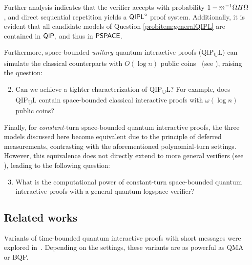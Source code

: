 \documentclass[11pt, a4paper]{article}
\numberwithin{equation}{section}
\numberwithin{figure}{section}
\newcommand{\BQP}{\textnormal{\textsf{BQP}}\xspace}
\newcommand{\QMA}{\textnormal{\textsf{QMA}}\xspace}
\newcommand{\QIP}{\textnormal{\textsf{QIP}}\xspace}
\newcommand{\QIPL}{\textnormal{\textsf{QIPL}}\xspace}
\newcommand{\QIPUL}{\texorpdfstring{\textnormal{\textsf{QIP}\textsubscript{\textnormal{U}}\textsf{L}}}\xspace}
\newcommand{\PSPACE}{\textnormal{\textsf{PSPACE}}\xspace}
\let\ket\relax\DeclarePairedDelimiter\ket{\lvert}{\rangle}
\let\bra\relax\DeclarePairedDelimiter\bra{\langle}{\rvert}
\begin{document}
Further analysis indicates that the verifier accepts with probability $1-m^{-1} \bra{\Omega} H \ket{\Omega}$, and direct sequential repetition yields a $\QIPL^{\diamond}$ proof system. 
Additionally, it is evident that all candidate models of Question \ref{probitem:generalQIPL} are contained in $\QIP$, and thus in $\PSPACE$.

\vspace{0.5em}
Furthermore, space-bounded \textit{unitary} quantum interactive proofs (\QIPUL{}) can simulate the classical counterparts with $O(\log{n})$ public coins~\cite{Fortnow89} (see ), raising the question: 
\begin{enumerate}[label={\upshape(\alph*)},itemsep=0.3em,topsep=0.3em,parsep=0.3em]
    \setcounter{enumi}{1}
    \item Can we achieve a tighter characterization of \QIPUL{}? For example, does \QIPUL{} contain space-bounded classical interactive proofs with $\omega(\log{n})$ public coins? \label{probitem:QIPUL}
\end{enumerate}

\vspace{0.5em}
Finally, for \textit{constant}-turn space-bounded quantum interactive proofs, the three models discussed here become equivalent due to the principle of deferred measurements, contrasting with the aforementioned polynomial-turn settings. However, this equivalence does not directly extend to more general verifiers (see ), leading to the following question: 

\begin{enumerate}[label={\upshape(\alph*)},itemsep=0.3em,topsep=0.3em,parsep=0.3em]
    \setcounter{enumi}{2}
    \item What is the computational power of constant-turn space-bounded quantum interactive proofs with a general quantum logspace verifier?  \label{probitem:constTurnQIPL}
\end{enumerate}

\subsection{Related works}
Variants of time-bounded quantum interactive proofs with short messages were explored in~\cite{BSW11,Pereszlenyi12}. Depending on the settings, these variants are as powerful as \QMA{} or \BQP{}. 
\end{document}

